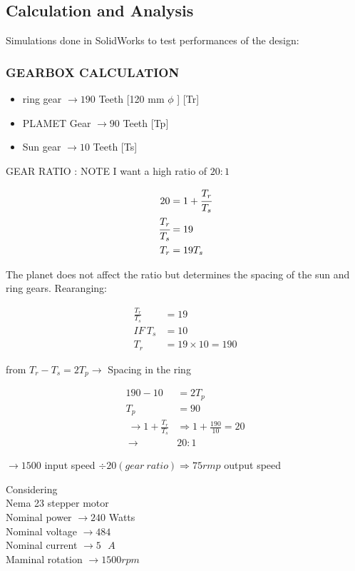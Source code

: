\documentclass[../../main]{subfiles}
\begin{document}
\subsection{Calculation and Analysis}

Simulations done in SolidWorks to test performances of the design:


\subsubsection{GEARBOX CALCULATION}


\begin{itemize}
\item
  ring gear \(\rightarrow 190\) Teeth {[}120 mm \(\phi\) {]} {[}Tr{]}
\item
  PLAMET Gear \(\rightarrow 90\) Teeth {[}Tp{]}
\item
  Sun gear \(\rightarrow 10\) Teeth {[}Ts{]}
\end{itemize}

GEAR RATIO : NOTE I want a high ratio of $20:1$

\[\begin{aligned}
  20 &= 1 + \cfrac{T_{r}}{T_{s}} \\
  \cfrac{T_{r}}{T_{s}} &= 19 \\
  T_{r} &= 19T_{s}
\end{aligned}\]

The planet does not affect the ratio but determines the spacing of the
sun and ring gears.
Rearanging:

\[\begin{aligned}
\frac{T_{r}}{T_{s}} &= 19 \\
IF\ T_{s} &= 10 \\
T_{r} &= 19 \times 10 = 190
\end{aligned}\]

from \(T_{r} - T_{s} = 2T_{p} \rightarrow\) Spacing in the ring

\[\begin{aligned}
190 - 10 &= 2T_{p} \\
T_{p} &= 90 \\
\ \to 1 + \frac{T_{r}}{T_{s}} &\Rightarrow 1 + \frac{190}{10} = 20 \\
\ \to &20:1
\end{aligned}\]

\(\to 1500\) input speed
\(\div 20(gear\ ratio) \Rightarrow 75rmp\) output speed

Considering\\
Nema 23 stepper motor\\
Nominal power \(\rightarrow 240\) Watts\\
Nominal voltage \(\rightarrow 484\)\\
Nominal current \(\rightarrow 5\text{ }A\)\\
Maminal rotation \(\rightarrow 1500rpm\)
\end{document}
